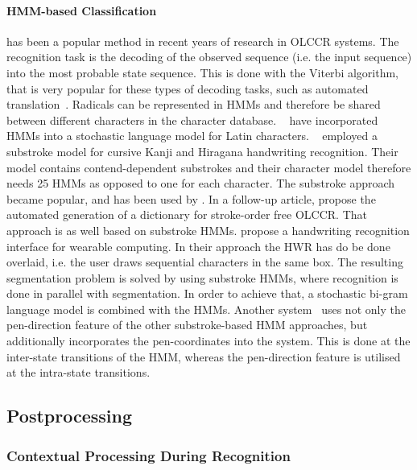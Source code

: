 \paragraph{HMM-based Classification} has been a popular method in recent years of
research in OLCCR systems. The recognition task is the decoding of the 
observed sequence (i.e. the input sequence) into the most probable state 
sequence. This is done with the Viterbi algorithm, that is very popular for
these types of decoding tasks, such as automated 
translation~. Radicals can be represented in HMMs and 
therefore be shared between different characters in the character database.
~\citeyear{Hu1996} have incorporated HMMs into a 
stochastic language model for Latin characters. 
~\citeyear{Tokuno2002} employed a substroke model for 
cursive Kanji and Hiragana handwriting recognition. Their model contains 
contend-dependent substrokes and their character model therefore needs 25 HMMs
as opposed to one for each character. The substroke approach became popular,
and has been used by . In a follow-up article, 
 propose the automated generation of a dictionary for 
stroke-order free OLCCR. That approach is as well based on substroke HMMs.
 propose a handwriting recognition interface for 
wearable computing. In their approach the HWR has do be done overlaid, i.e. the
user draws sequential characters in the same box. The resulting segmentation
problem is solved by using substroke HMMs, where recognition is done in parallel
with segmentation. In order to achieve that, a stochastic bi-gram language model
is combined with the HMMs.
Another system~ uses not only the pen-direction feature 
of the other substroke-based HMM approaches, but additionally incorporates the 
pen-coordinates into the system. This is done at the inter-state transitions of 
the HMM, whereas the pen-direction feature is utilised at the intra-state 
transitions.

\subsection{Postprocessing}
\label{sec:olccr:postprocessing}

\subsubsection{Contextual Processing During Recognition}
\label{sec:olccr:contextualprocessingduring}

